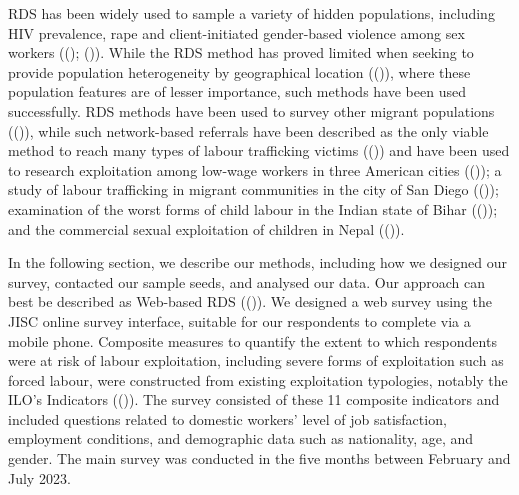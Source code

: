 \documentclass[
  12pt,
]{article}
\theoremstyle{plain}
\theoremstyle{definition}
\begin{document}
RDS has been widely used to sample a variety of hidden populations,
including HIV prevalence, rape and client-initiated gender-based
violence among sex workers
(();
()).
While the RDS method has proved limited when seeking to provide
population heterogeneity by geographical location
(()),
where these population features are of lesser importance, such methods
have been used successfully. RDS methods have been used to survey other
migrant populations
(()),
while such network-based referrals have been described as the only
viable method to reach many types of labour trafficking victims
(())
and have been used to research exploitation among low-wage workers in
three American cities
(());
a study of labour trafficking in migrant communities in the city of San
Diego
(());
examination of the worst forms of child labour in the Indian state of
Bihar
(());
and the commercial sexual exploitation of children in Nepal
(()).

In the following section, we describe our methods, including how we
designed our survey, contacted our sample seeds, and analysed our data.
Our approach can best be described as Web-based RDS
(()).
We designed a web survey using the JISC online survey interface,
suitable for our respondents to complete via a mobile phone. Composite
measures to quantify the extent to which respondents were at risk of
labour exploitation, including severe forms of exploitation such as
forced labour, were constructed from existing exploitation typologies,
notably the ILO's Indicators
(()). The survey consisted
of these 11 composite indicators and included questions related to
domestic workers' level of job satisfaction, employment conditions, and
demographic data such as nationality, age, and gender. The main survey
was conducted in the five months between February and July 2023.
\end{document}
